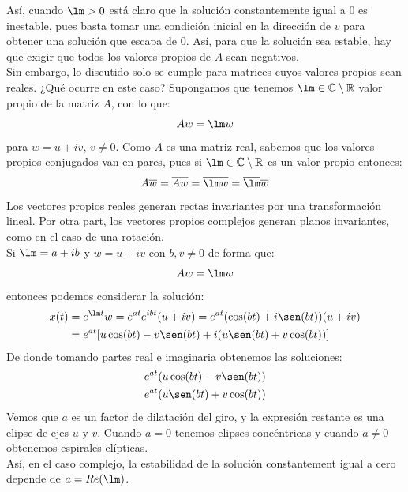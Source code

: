\noindent
Así, cuando $\lm>0$ está claro que la solución constantemente igual a $0$ es inestable, pues basta tomar una condición inicial en la dirección de $v$ para obtener una solución que escapa de $0$. Así, para que la solución sea estable, hay que exigir que todos los valores propios de $A$ sean negativos.\\

\noindent
Sin embargo, lo discutido solo se cumple para matrices cuyos valores propios sean reales. ¿Qué ocurre en este caso? Supongamos que tenemos $\lm\in \mathbb{C}\setminus \mathbb{R}$ valor propio de la matriz $A$, con lo que:
\begin{equation*}
    A w = \lm w
\end{equation*}
para $w = u + iv$, $v\neq 0$. Como $A$ es una matriz real, sabemos que los valores propios conjugados van en pares, pues si $\lm\in \mathbb{C}\setminus \mathbb{R}$ es un valor propio entonces:
\begin{equation*}
    A\overline{w} = \overline{Aw} = \overline{\lm w} = \overline{\lm}\overline{w}
\end{equation*}
Los vectores propios reales generan rectas invariantes por una transformación lineal. Por otra part, los vectores propios complejos generan planos invariantes, como en el caso de una rotación.\\

\noindent
Si $\lm = a + ib$ y $w= u+iv$ con $b,v\neq 0$ de forma que:
\begin{equation*}
    Aw = \lm w
\end{equation*}
entonces podemos considerar la solución:
\begin{align*}
    x(t) &= e^{\lm t}w = e^{at} e^{ibt}(u + iv) = e^{at}(\cos (bt) + i\sen (bt))(u+iv) \\
         &= e^{at}[u\cos (bt)-v\sen(bt) + i (u\sen(bt) + v\cos(bt))]
\end{align*}
De donde tomando partes real e imaginaria obtenemos las soluciones:
\begin{align*}
    e^{at}(u\cos(bt) - v\sen(bt)) \\
    e^{at}(u\sen(bt) + v\cos(bt))
\end{align*}
Vemos que $a$ es un factor de dilatación del giro, y la expresión restante es una elipse de ejes $u$ y $v$. Cuando $a=0$ tenemos elipses concéntricas y cuando $a\neq0$ obtenemos espirales elípticas.\\

\noindent
Así, en el caso complejo, la estabilidad de la solución constantement igual a cero depende de $a = Re(\lm)$.

